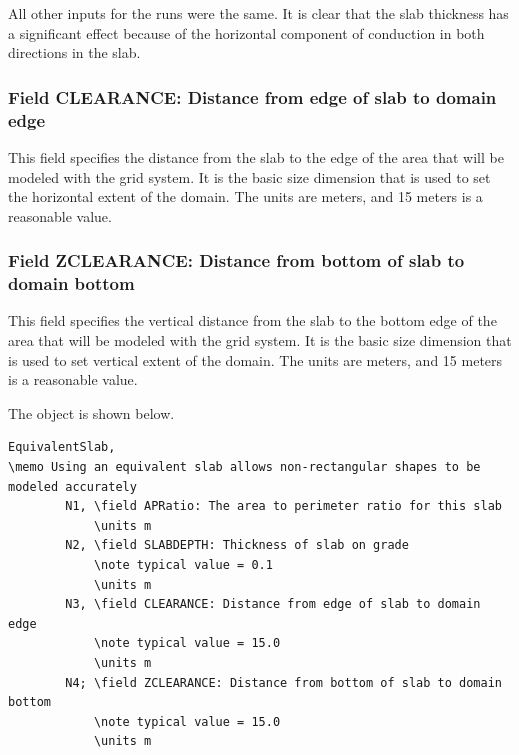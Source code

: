 All other inputs for the runs were the same. It is clear that the slab thickness has a significant effect because of the horizontal component of conduction in both directions in the slab.

\subsubsection{Field CLEARANCE: Distance from edge of slab to domain edge}\label{field-clearance-distance-from-edge-of-slab-to-domain-edge}

This field specifies the distance from the slab to the edge of the area that will be modeled with the grid system. It is the basic size dimension that is used to set the horizontal extent of the domain. The units are meters, and 15 meters is a reasonable value.

\subsubsection{Field ZCLEARANCE: Distance from bottom of slab to domain bottom}\label{field-zclearance-distance-from-bottom-of-slab-to-domain-bottom}

This field specifies the vertical distance from the slab to the bottom edge of the area that will be modeled with the grid system. It is the basic size dimension that is used to set vertical extent of the domain. The units are meters, and 15 meters is a reasonable value.

The object is shown below.

\begin{lstlisting}
EquivalentSlab,
\memo Using an equivalent slab allows non-rectangular shapes to be modeled accurately
        N1, \field APRatio: The area to perimeter ratio for this slab
            \units m
        N2, \field SLABDEPTH: Thickness of slab on grade
            \note typical value = 0.1
            \units m
        N3, \field CLEARANCE: Distance from edge of slab to domain edge
            \note typical value = 15.0
            \units m
        N4; \field ZCLEARANCE: Distance from bottom of slab to domain bottom
            \note typical value = 15.0
            \units m
\end{lstlisting}

